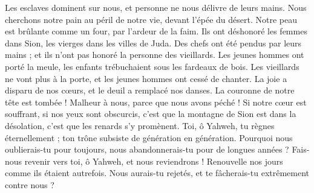 \begin{multicols}{2}
Les esclaves dominent sur nous, et personne ne nous délivre de leurs mains.
Nous cherchons notre pain au péril de notre vie, devant l’épée du désert.
Notre peau est brûlante comme un four, par l’ardeur de la faim.
Ils ont déshonoré les femmes dans Sion, les vierges dans les villes de Juda.
Des chefs ont été pendus par leurs mains ; et ils n'ont pas honoré la personne des vieillards.
Les jeunes hommes ont porté la meule, les enfants trébuchaient sous les fardeaux de bois.
Les vieillards ne vont plus à la porte, et les jeunes hommes ont cessé de chanter.
La joie a disparu de nos cœurs, et le deuil a remplacé nos danses.
La couronne de notre tête est tombée ! Malheur à nous, parce que nous avons péché !
Si notre cœur est souffrant, si nos yeux sont obscurcis,
c'est que la montagne de Sion est dans la désolation, c'est que les renards s'y promènent.
Toi, ô Yahweh, tu règnes éternellement ;  ton trône subsiste de génération en génération.
Pourquoi nous oublierais-tu pour toujours, nous abandonnerais-tu pour de longues années ?
Fais-nous revenir vers toi, ô Yahweh, et nous reviendrons ! Renouvelle nos jours comme ils étaient autrefois.
Nous aurais-tu rejetés, et te fâcherais-tu extrêmement contre nous ?
\PPE{}
\end{multicols}
